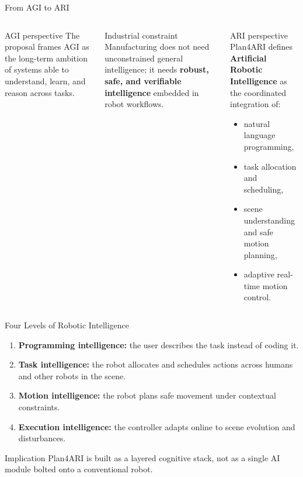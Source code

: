 \documentclass[aspectratio=169,10pt]{beamer}
\begin{document}
\begin{frame}{From AGI to ARI}

\begin{columns}[T,totalwidth=\textwidth]
\begin{block}{AGI perspective}
The proposal frames AGI as the long-term ambition of systems able to understand, learn, and reason across tasks.
\end{block}
\begin{block}{Industrial constraint}
Manufacturing does not need unconstrained general intelligence; it needs \textbf{robust, safe, and verifiable intelligence} embedded in robot workflows.
\end{block}
\begin{block}{ARI perspective}
Plan4ARI defines \textbf{Artificial Robotic Intelligence} as the coordinated integration of:
\begin{itemize}
  \item natural language programming,
  \item task allocation and scheduling,
  \item scene understanding and safe motion planning,
  \item adaptive real-time motion control.
\end{itemize}
\end{block}
\end{columns}

\end{frame}


\begin{frame}{Four Levels of Robotic Intelligence}

\begin{enumerate}
  \item \textbf{Programming intelligence:} the user describes the task instead of coding it.
  \item \textbf{Task intelligence:} the robot allocates and schedules actions across humans and other robots in the scene.
  \item \textbf{Motion intelligence:} the robot plans safe movement under contextual constraints.
  \item \textbf{Execution intelligence:} the controller adapts online to scene evolution and disturbances.
\end{enumerate}
\begin{alertblock}{Implication}
Plan4ARI is built as a layered cognitive stack, not as a single AI module bolted onto a conventional robot.
\end{alertblock}

\end{frame}
\end{document}
